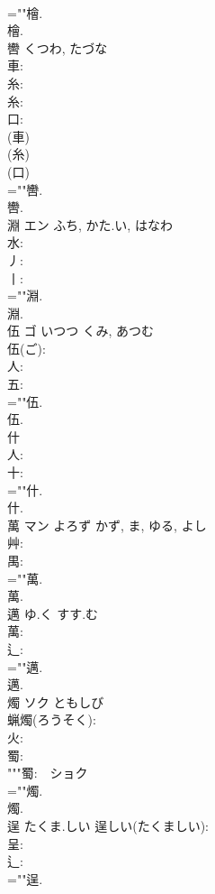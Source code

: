 \documentclass[8pt]{extreport}
\begin{document}
\begin{CJK}{UTF8}{min}
\\	=""檜.
\\	檜.
\\	轡		くつわ, たづな				
\\	車: 
\\	糸: 
\\	糸: 
\\	口: 
\\	(車) 
\\	(糸) 
\\	(口) 
\\	=""轡.
\\	轡.
\\	淵	エン	ふち, かた.い, はなわ		
\\	水: 
\\	丿: 
\\	丨: 
\\	=""淵.
\\	淵.
\\	伍	ゴ	いつつ	くみ, あつむ	
\\	伍(ご): 
\\	人: 
\\	五: 
\\	=""伍.
\\	伍.
\\	什						
\\	人: 
\\	十: 
\\	=""什.
\\	什.
\\	萬	マン	よろず	かず, ま, ゆる, よし	
\\	艸: 
\\	禺: 
\\	=""萬.
\\	萬.
\\	邁		ゆ.く	すす.む			
\\	萬: 
\\	辶: 
\\	=""邁.
\\	邁.
\\	燭	ソク	ともしび		
\\	蝋燭(ろうそく): 
\\	火: 
\\	蜀: 
\\	"""蜀:　ショク　
\\	=""燭.
\\	燭.
\\	逞		たくま.しい			逞しい(たくましい): 
\\	呈: 
\\	辶: 
\\	=""逞.

\end{CJK}
\end{document}
